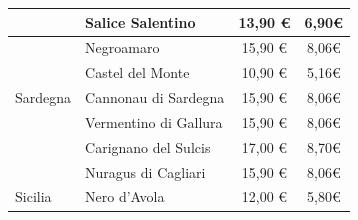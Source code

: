 \documentclass[12pt, a4paper]{article}
\begin{document}
\begin{longtable}{@{}|l|l|c|c|}
                         & Salice Salentino                                                          & 13,90 €                                                         & 6,90€                                                                                                         \\ \hline
                         & Negroamaro                                                                & 15,90 €                                                         & 8,06€                                                                                                         \\ \hline
                         & Castel del Monte                                                          & 10,90 €                                                          & 5,16€                                                                                                         \\ \hline
    Sardegna             & Cannonau di Sardegna                                                      & 15,90 €                                                         & 8,06€                                                                                                         \\ \hline
                         & Vermentino di Gallura                                                     & 15,90 €                                                         & 8,06€                                                                                                         \\ \hline
                         & Carignano del Sulcis                                                      & 17,00 €                                                         & 8,70€                                                                                                         \\ \hline
                         & Nuragus di Cagliari                                                       & 15,90 €                                                         & 8,06€                                                                                                         \\ \hline
    Sicilia              & Nero d'Avola                                                              & 12,00 €                                                         & 5,80€                                                                                                         \\ \hline

\end{longtable}
\end{document}

